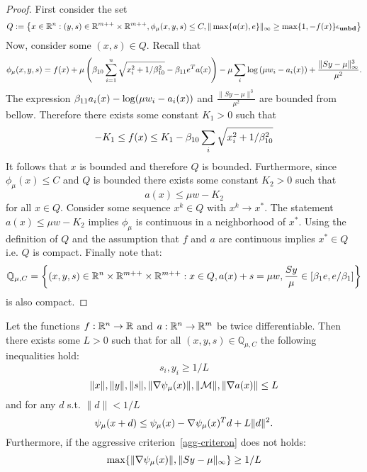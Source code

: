 \documentclass{article}
\begin{document}
\begin{proof}
First consider the set
$$
Q := \left\{ x \in \mathbb{R}^{n} : (y, s) \in \mathbb{R}^{m++} \times \mathbb{R}^{m++}, \phi_{\mu}(x,y,s) \le C, \| \max\{ a(x), e \} \|_{\infty} \ge \max\{1,-f(x) \} \epsilon_{\textbf{unbd}} \right\} 
$$
Now, consider some $(x,s) \in Q$. Recall that
$$
\phi_{\mu}(x, y, s) = f(x) + \mu \left( \beta_{10} \sum_{i = 1}^{n} \sqrt{x_i^2 + 1 / \beta_{10}^2} - \beta_{11} e^T a(x) \right)  - \mu  \sum_i{ \log \left( \mu w_i - a_i(x)  \right) } + \frac{\| S y - \mu \|_{\infty}^3}{\mu^2}.
$$
The expression $\beta_{11} a_i(x) - \log(\mu w_i - a_i(x))$ and $\frac{\| S y - \mu \|^3}{\mu^2}$ are bounded from bellow. Therefore there exists some constant $K_{1} > 0$ such that
$$
-K_{1} \le f(x) \le K_{1} - \beta_{10} \sum_{i}{\sqrt{x_i^2 + 1 / \beta_{10}^2}}
$$
It follows that $x$ is bounded and therefore $Q$ is bounded. Furthermore, since $\phi_{\mu}(x) \le C$ and $Q$ is bounded there exists some constant $K_{2} > 0$ such that
$$
a(x) \le \mu w - K_{2}
$$
for all $x \in Q$. Consider some sequence $x^{k} \in Q$ with $x^{k} \rightarrow x^{*}$. The statement $a(x) \le \mu w - K_{2}$ implies $\phi_{\mu}$ is continuous in a neighborhood of $x^{*}$. Using the definition of $Q$ and the assumption that $f$ and $a$ are continuous implies $x^{*} \in Q$ i.e. $Q$ is compact. Finally note that:
$$
\mathbb{Q}_{\mu, C} = \left\{ (x,y,s) \in \mathbb{R}^{n} \times \mathbb{R}^{m++} \times \mathbb{R}^{m++} : x \in Q, a(x) + s = \mu w, \frac{S y}{\mu} \in [\beta_{1} e, e / \beta_{1}]\right\}
$$
is also compact.
\end{proof}

\begin{corollary}\label{coro:bound-everything}
Let the functions $f : \mathbb{R}^{n} \rightarrow \mathbb{R}$ and $a : \mathbb{R}^{n} \rightarrow \mathbb{R}^{m}$ be twice differentiable.
Then there exists some $L > 0$ such that for all $(x, y, s) \in \mathbb{Q}_{\mu, C}$ the following inequalities hold:
$$
s_i, y_i \ge 1/L
$$
$$
\| x \|, \| y \|, \| s \|, \| \nabla \psi_{\mu}(x) \|, \| \mathcal{M} \|, \| \nabla a(x) \| \le L
$$
and for any $d$ s.t. $\| d \| < 1 / L$
$$
\psi_{\mu}(x + d) \le \psi_{\mu}(x) - \nabla \psi_{\mu}(x)^T d + L \| d \|^2.
$$
Furthermore, if the aggressive criterion~\eqref{agg-criteron} does not holds:
$$
\max\{ \| \nabla \psi_{\mu}(x) \|, \| S y - \mu \|_{\infty} \} \ge 1 / L
$$
\end{corollary}
\end{document}
